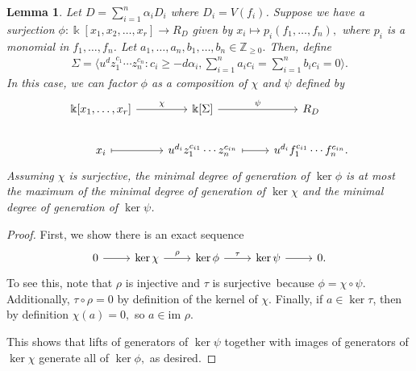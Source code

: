 \documentclass{amsart}
\theoremstyle{plain}
\newtheorem{lem}[thm]{Lemma}
\theoremstyle{definition}
\theoremstyle{remark}
\numberwithin{equation}{section}
\newcommand\bz{{\mathbb Z}}
\newcommand\bk{{\Bbbk}}
\newcommand\im{\text{im }}
\newcommand\bida{a}
\newcommand\bidb{b}
\begin{document}
\begin{lem}
\label{lem:composite-map}
Let $D = \sum_{i=1}^{n}\alpha_i D_i$ where $D_i = V(f_i)$. Suppose we have a
surjection $\phi: \bk[x_1,x_2,\ldots, x_r] \rightarrow R_D$ given by $x_i
\mapsto p_i(f_1, \ldots, f_n),$ where $p_i$ is a monomial in $f_1,\ldots, f_n$.
Let $\bida_1, \ldots, \bida_n, \bidb_1, \ldots, \bidb_n \in \bz_{\geq 0}.$
Then, define
\begin{align*}
	\Sigma = \langle u^d z_1^{c_1} \cdots z_n^{c_n} : c_i \geq -d \alpha_i, \sum_{i=1}^{n} \bida_i c_i = \sum_{i=1}^{n} \bidb_i c_i = 0 \rangle. 
\end{align*}
In this case, we can factor $\phi$ as a composition of $\chi$ and $\psi$ defined by
\[
\begin{tikzcd}
\bk[x_1,\ldots, x_r] \ar {r}{\chi} & \bk[\Sigma] \ar {r}{\psi} & R_D \\
x_i \arrow[mapsto]{r} & u^{d_i}z_1^{c_{i1}} \cdots z_n^{c_{in}} \arrow[mapsto]{r} & u^{d_i}f_1^{c_{i1}} \cdots f_n^{c_{in}}.
\end{tikzcd}
\]
Assuming $\chi$ is surjective, the minimal degree of generation of $\ker \phi$
is at most the maximum of the minimal degree of generation of $\ker \chi$ and
the minimal degree of generation of $\ker \psi$.
\end{lem}
\begin{proof}
First, we show there is an exact sequence
\[
\begin{tikzcd}
0 \ar {r} & \ker \chi \ar{r}{\rho} & \ker \phi \ar {r}{\tau} & \ker \psi \ar r & 0.
\end{tikzcd}
\]
To see this, note that $\rho$ is injective and $\tau$ is surjective\ because
$\phi = \chi \circ \psi$. Additionally, $\tau \circ \rho = 0$ by definition of
the kernel of $\chi$. Finally, if $a \in\ker \tau$, then by definition $\chi(a)
= 0,$ so $a \in \im \rho$.

This shows that lifts of generators of $\ker \psi$ together with images of
generators of $\ker \chi$ generate all of $\ker \phi,$ as desired. 
\end{proof}
\end{document}
